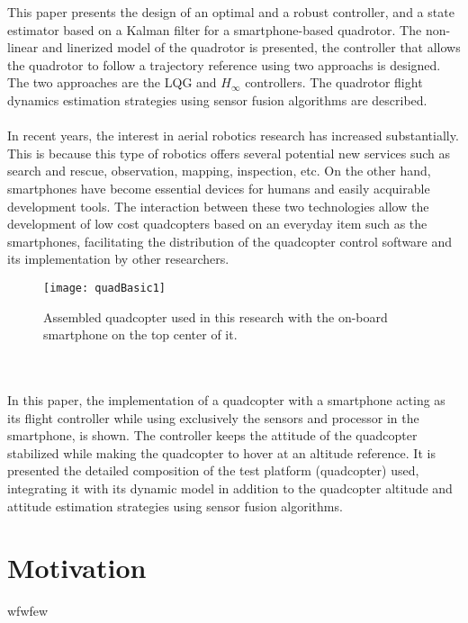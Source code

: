 This paper presents the design of an optimal and a robust controller, and a state estimator based on a Kalman filter for a smartphone-based quadrotor. The non-linear and linerized model of the quadrotor is presented, the controller that allows the quadrotor to follow a trajectory reference using two approachs is designed. The two approaches are the LQG and $H_\infty$ controllers. The quadrotor flight dynamics estimation strategies using sensor fusion algorithms are described. 
\\\\
In recent years, the interest in aerial robotics research has increased substantially. This is because this type of robotics offers several potential new services such as search and rescue, observation, mapping, inspection, etc. On the other hand, smartphones have become essential devices for humans and easily acquirable development tools. The interaction between these two technologies allow the development of low cost quadcopters based on an everyday item such as the smartphones, facilitating the distribution of the quadcopter control software and its implementation by other researchers.
\begin{figure}[h]
\begin{center}
\texttt{[image: quadBasic1]}    
\caption{Assembled quadcopter used in this research with the on-board smartphone on the top center of it.} 
\label{fig:quads500}
\end{center}
\end{figure}
\\\\

In this paper, the implementation of a quadcopter with a smartphone acting as its flight controller while using exclusively the sensors and processor in the smartphone, is shown. The controller keeps the attitude of the quadcopter stabilized while making the quadcopter to hover at an altitude reference. It is presented the detailed composition of the test platform (quadcopter) used, integrating it with its dynamic model in addition to the quadcopter altitude and attitude estimation strategies using sensor fusion algorithms.
\section{Motivation}
wfwfew

